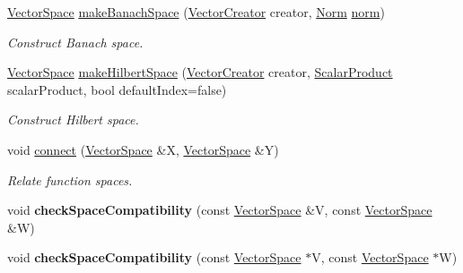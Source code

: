 \begin{DoxyCompactItemize}
\item 
\hyperlink{classSpacy_1_1VectorSpace}{Vector\+Space} \hyperlink{group__SpacyGroup_gabfc17f845736365ee79be8ce68d50b27_gabfc17f845736365ee79be8ce68d50b27}{make\+Banach\+Space} (\hyperlink{group__SpacyGroup_ga1f5316487c031a478247206764bb2efb_ga1f5316487c031a478247206764bb2efb}{Vector\+Creator} creator, \hyperlink{group__SpacyGroup_gaf4f33b11d657c48566d961a013c92bd1_gaf4f33b11d657c48566d961a013c92bd1}{Norm} \hyperlink{group__SpacyGroup_ga86a4fc266aa19a07b0af16388907354b_ga86a4fc266aa19a07b0af16388907354b}{norm})
\begin{DoxyCompactList}\small\item\em Construct Banach space. \end{DoxyCompactList}\item 
\hyperlink{classSpacy_1_1VectorSpace}{Vector\+Space} \hyperlink{group__SpacyGroup_ga63c49d211bf214be1fb321440ed03aad_ga63c49d211bf214be1fb321440ed03aad}{make\+Hilbert\+Space} (\hyperlink{group__SpacyGroup_ga1f5316487c031a478247206764bb2efb_ga1f5316487c031a478247206764bb2efb}{Vector\+Creator} creator, \hyperlink{group__SpacyGroup_ga9fe0b4de20da1ab1ca3d04a0f96343e1_ga9fe0b4de20da1ab1ca3d04a0f96343e1}{Scalar\+Product} scalar\+Product, bool default\+Index=false)
\begin{DoxyCompactList}\small\item\em Construct Hilbert space. \end{DoxyCompactList}\item 
void \hyperlink{group__SpacyGroup_gad115dc8703f23d8070c7da07a59ca067_gad115dc8703f23d8070c7da07a59ca067}{connect} (\hyperlink{classSpacy_1_1VectorSpace}{Vector\+Space} \&X, \hyperlink{classSpacy_1_1VectorSpace}{Vector\+Space} \&Y)
\begin{DoxyCompactList}\small\item\em Relate function spaces. \end{DoxyCompactList}\item 
\hypertarget{namespaceSpacy_aae18423491adef608743902f1c40844e}{}void {\bfseries check\+Space\+Compatibility} (const \hyperlink{classSpacy_1_1VectorSpace}{Vector\+Space} \&V, const \hyperlink{classSpacy_1_1VectorSpace}{Vector\+Space} \&W)\label{namespaceSpacy_aae18423491adef608743902f1c40844e}

\item 
\hypertarget{namespaceSpacy_ac814992b4f38529dc1daca8a6856af03}{}void {\bfseries check\+Space\+Compatibility} (const \hyperlink{classSpacy_1_1VectorSpace}{Vector\+Space} $\ast$V, const \hyperlink{classSpacy_1_1VectorSpace}{Vector\+Space} $\ast$W)\label{namespaceSpacy_ac814992b4f38529dc1daca8a6856af03}

\end{DoxyCompactItemize}


